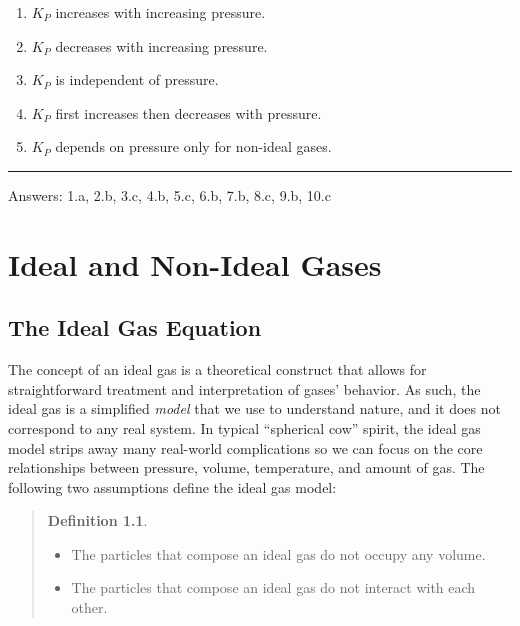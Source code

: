 \documentclass[
  9pt,
]{extbook}
\providecommand{\tightlist}{%
  \setlength{\itemsep}{0pt}\setlength{\parskip}{0pt}}
\theoremstyle{definition}
\newtheorem{definition}{Definition}[chapter]
\theoremstyle{definition}
\theoremstyle{definition}
\theoremstyle{definition}
\theoremstyle{remark}
\begin{document}
\begin{enumerate}
\def\labelenumi{\alph{enumi}.}
\tightlist
\item
  \(K_P\) increases with increasing pressure.
\item
  \(K_P\) decreases with increasing pressure.
\item
  \(K_P\) is independent of pressure.
\item
  \(K_P\) first increases then decreases with pressure.
\item
  \(K_P\) depends on pressure only for non-ideal gases.
\end{enumerate}

\begin{center}\rule{0.5\linewidth}{0.5pt}\end{center}

Answers: 1.a, 2.b, 3.c, 4.b, 5.c, 6.b, 7.b, 8.c, 9.b, 10.c

\renewcommand*{\standardstate}{{-\kern-6pt{\ominus}\kern-6pt-}}

\chapter{Ideal and Non-Ideal Gases}\label{RealGases}

\section{The Ideal Gas Equation}\label{the-ideal-gas-equation}

The concept of an ideal gas is a theoretical construct that allows for straightforward treatment and interpretation of gases' behavior. As such, the ideal gas is a simplified \emph{model} that we use to understand nature, and it does not correspond to any real system. In typical ``spherical cow'' spirit, the ideal gas model strips away many real-world complications so we can focus on the core relationships between pressure, volume, temperature, and amount of gas. The following two assumptions define the ideal gas model:

\begin{quote}
\begin{definition}
\protect\hypertarget{def:iedalgasdef}{}\label{def:iedalgasdef}\leavevmode

\begin{itemize}
\tightlist
\item
  The particles that compose an ideal gas do not occupy any volume.
\item
  The particles that compose an ideal gas do not interact with each other.
\end{itemize}

\end{definition}
\end{quote}
\end{document}

